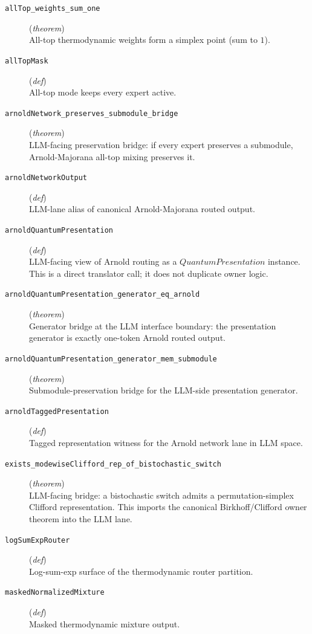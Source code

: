 \documentclass[11pt,a4paper]{article}
\begin{document}
\begin{description}
  \item[\texttt{allTop\_weights\_sum\_one}] (\textit{theorem}) \\ All-top thermodynamic weights form a simplex point (sum to $1$).
  \item[\texttt{allTopMask}] (\textit{def}) \\ All-top mode keeps every expert active.
  \item[\texttt{arnoldNetwork\_preserves\_submodule\_bridge}] (\textit{theorem}) \\ LLM-facing preservation bridge: 
if every expert preserves a submodule, Arnold-Majorana all-top mixing preserves it.
  \item[\texttt{arnoldNetworkOutput}] (\textit{def}) \\ LLM-lane alias of canonical Arnold-Majorana routed output.
  \item[\texttt{arnoldQuantumPresentation}] (\textit{def}) \\ LLM-facing view of Arnold routing as a $QuantumPresentation$ instance. 
This is a direct translator call; it does not duplicate owner logic.
  \item[\texttt{arnoldQuantumPresentation\_generator\_eq\_arnold}] (\textit{theorem}) \\ Generator bridge at the LLM interface boundary: the presentation generator is 
exactly one-token Arnold routed output.
  \item[\texttt{arnoldQuantumPresentation\_generator\_mem\_submodule}] (\textit{theorem}) \\ Submodule-preservation bridge for the LLM-side presentation generator.
  \item[\texttt{arnoldTaggedPresentation}] (\textit{def}) \\ Tagged representation witness for the Arnold network lane in LLM space.
  \item[\texttt{exists\_modewiseClifford\_rep\_of\_bistochastic\_switch}] (\textit{theorem}) \\ LLM-facing bridge: a bistochastic switch admits a permutation-simplex Clifford representation. 
This imports the canonical Birkhoff/Clifford owner theorem into the LLM lane.
  \item[\texttt{logSumExpRouter}] (\textit{def}) \\ Log-sum-exp surface of the thermodynamic router partition.
  \item[\texttt{maskedNormalizedMixture}] (\textit{def}) \\ Masked thermodynamic mixture output.

\end{description}
\end{document}
